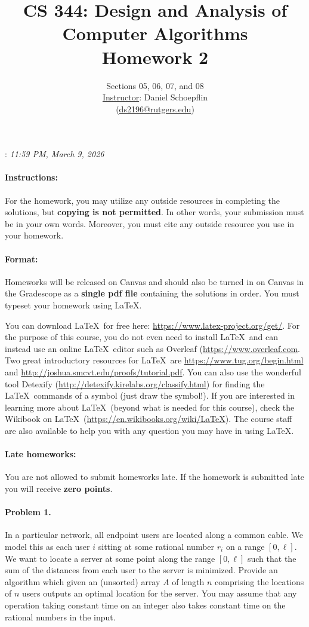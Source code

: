 \documentclass[10pt]{article}
\title{CS 344: Design and Analysis of Computer Algorithms\\
Homework 2}
\author{Sections 05, 06, 07, and 08\\
\underline{Instructor}: Daniel Schoepflin\\
(\url{ds2196@rutgers.edu})}
\date{}
\begin{document}
\maketitle
{: {\it 11:59 PM, March 9, 2026}


}

\paragraph{Instructions:} For the homework, you may utilize any outside resources in completing the solutions, but \textbf{copying is not permitted}.  In other words, your submission must be in your own words.  Moreover, you must cite any outside resource you use in your homework.

\paragraph{Format:} Homeworks will be released on Canvas and should also be turned in on Canvas in the Gradescope as a {\bf single pdf file} containing the solutions in order. You must typeset your homework using 
\LaTeX.   

You can download \LaTeX\ for free here: \url{https://www.latex-project.org/get/}. For the purpose of this course, you do not even need to install \LaTeX\ and 
can instead use an online \LaTeX\ editor such as Overleaf (\url{https://www.overleaf.com}.
Two great introductory resources for  \LaTeX\ are \url{https://www.tug.org/begin.html}  and \url{http://joshua.smcvt.edu/proofs/tutorial.pdf}. 
You can also use the wonderful tool Detexify (\url{http://detexify.kirelabs.org/classify.html})  for finding the
 \LaTeX\ commands of a symbol (just draw the symbol!).  
If you are interested in learning more about \LaTeX\ (beyond what is needed for this course), check the Wikibook on \LaTeX\ (\url{https://en.wikibooks.org/wiki/LaTeX}). 
The course staff are also available to help you with any question you may have in using \LaTeX.



\paragraph{Late homeworks:} You are not allowed to submit homeworks late.  If the homework is submitted late you will receive {\bf zero points}. 
\clearpage


\paragraph{Problem 1.} In a particular network, all endpoint users are located along a common cable.  We model this as each user $i$ sitting at some rational number $r_i$ on a range $[0,\ell]$.  We want to locate a server at some point along the range $[0,\ell]$ such that the sum of the distances from each user to the server is minimized.  Provide an algorithm which given an (unsorted) array $A$ of length $n$ comprising the locations of $n$ users outputs an optimal location for the server.  You may assume that any operation taking constant time on an integer also takes constant time on the rational numbers in the input.
\end{document}
